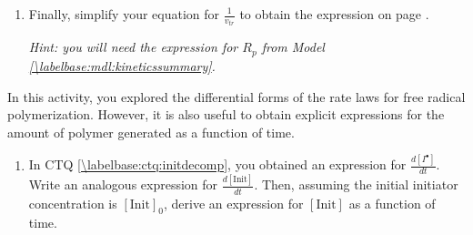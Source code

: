 \begin{activity}
\begin{exercises}
\begin{enumerate}
				\begin{solution}\end{solution}
				
			\item Finally, simplify your equation for $\frac{1}{v_{tr}}$ to obtain the expression on page \pageref{\labelbase:info:vtr}.
			
				\emph{Hint: you will need the expression for $R_p$ from Model \ref{\labelbase:mdl:kineticssummary}.}
			
				\begin{solution}\end{solution}
				
		\end{enumerate}
		
	\exercise In this activity, you explored the differential forms of the rate laws for free radical polymerization.   However, it is also useful to obtain explicit expressions for the amount of polymer generated as a function of time.
	
		\begin{enumerate}
			\item In CTQ \ref{\labelbase:ctq:initdecomp}, you obtained an expression for $\frac{d[I^\bullet]}{dt}$.  Write an analogous expression for $\frac{d[\text{Init}]}{dt}$.  Then, assuming the initial initiator concentration is $[\text{Init}]_0$, derive an expression for $[\text{Init}]$ as a function of time.
			

\end{enumerate}
\end{exercises}
\end{activity}

